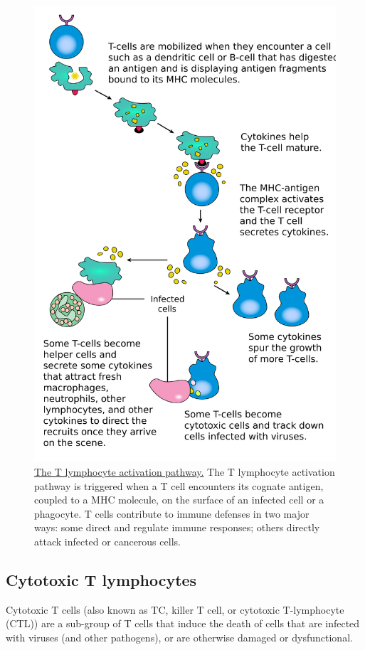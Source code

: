 \begin{figure}

{\centering \includegraphics[width=0.7\linewidth]{./figures/immune/T_cell_activation} 

}

\caption{\href{https://commons.wikimedia.org/wiki/File:T_cell_activation.svg}{The T lymphocyte activation pathway.} The T lymphocyte activation pathway is triggered when a T cell encounters its cognate antigen, coupled to a MHC molecule, on the surface of an infected cell or a phagocyte. T cells contribute to immune defenses in two major ways: some direct and regulate immune responses; others directly attack infected or cancerous cells.}\label{fig:tcellactivation}
\end{figure}

\hypertarget{cytotoxic-t-lymphocytes}{%
\subsection{Cytotoxic T lymphocytes}\label{cytotoxic-t-lymphocytes}}

Cytotoxic T cells (also known as TC, killer T cell, or cytotoxic T-lymphocyte (CTL)) are a sub-group of T cells that induce the death of cells that are infected with viruses (and other pathogens), or are otherwise damaged or dysfunctional.

